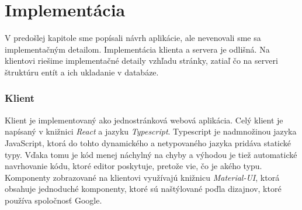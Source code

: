 \chapter{Implementácia}
V predošlej kapitole sme popísali návrh aplikácie, ale nevenovali sme sa implementačným detailom.
Implementácia klienta a servera je odlišná. Na klientovi riešime implementačné detaily vzhľadu
stránky, zatiaľ čo na serveri štruktúru entít a ich ukladanie v databáze.

\subsection{Klient}
Klient je implementovaný ako jednostránková webová aplikácia. Celý klient je napísaný v knižnici
\textit{React} a jazyku \textit{Typescript}. Typescript je nadmnožinou jazyka JavaScript, ktorá do
tohto dynamického a netypovaného jazyka pridáva statické typy. Vďaka tomu je kód menej náchylný na
chyby a výhodou je tiež automatické navrhovanie kódu, ktoré editor poskytuje, pretože vie, čo je
akého typu. Komponenty zobrazované na klientovi využívajú knižnicu \textit{Material-UI}, ktorá
obsahuje jednoduché komponenty, ktoré sú naštýlované poďla dizajnov, ktoré používa spoločnosť Google.

